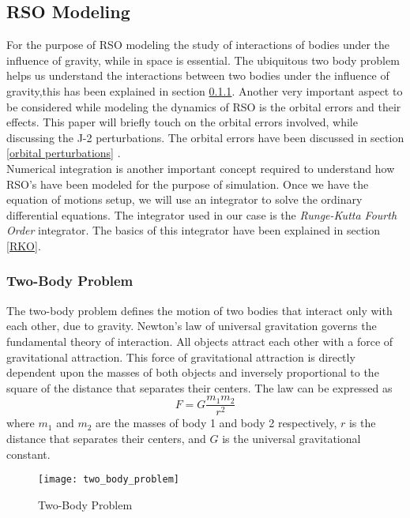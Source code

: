 \documentclass[]{aiaa-tc}%
\begin{document}
\subsection{RSO Modeling}

 For the purpose of RSO modeling the study of interactions of bodies under the influence of gravity, while in space is essential. The ubiquitous two body problem helps us understand the interactions between two bodies under the influence of gravity,this has been explained in section \ref{Two-Body Problem}. Another very important aspect to be considered while modeling the dynamics of RSO is the orbital errors and their effects. This paper will briefly touch on the orbital errors involved, while discussing the J-2 perturbations. The orbital errors have been discussed in section \ref{orbital perturbations} .\\ 
 
 
Numerical integration is another important concept required to understand how RSO's have been modeled for the purpose of simulation. Once we have the equation of motions setup, we will use an integrator to solve the ordinary differential equations. The integrator used in our case is the \textit{Runge-Kutta Fourth Order} integrator. The basics of this integrator have been explained in section \ref{RKO}.
\subsubsection{Two-Body Problem}
\label{Two-Body Problem}

The two-body problem defines the motion of two bodies that interact only with each other, due to gravity. Newton's law of universal gravitation governs the fundamental theory of interaction. All objects attract each other with a force of gravitational attraction. This force of gravitational attraction is directly dependent upon the masses of both objects and inversely proportional to the square of the distance that separates their centers. The law can be expressed as
\begin{equation}
F=G\frac{m_1m_2}{r^2}
\end{equation}
where $m_1$ and $m_2$ are the masses of body 1 and body 2 respectively, $r$ is the distance that separates their centers, and $G$ is the universal gravitational constant.\\

\begin{figure}[h]
  \centering
    \texttt{[image: two\_body\_problem]}
  \caption{Two-Body Problem}
  \label{fig:two_body_problem}
\end{figure}
\end{document}
